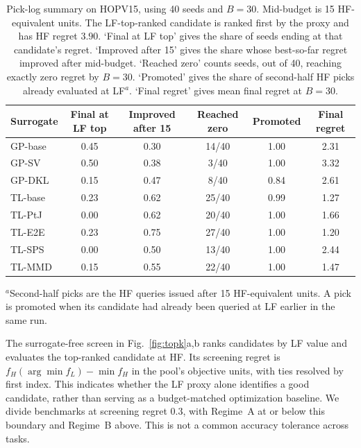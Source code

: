 \begin{table}[p]
\centering
\scriptsize
\caption{Pick-log summary on HOPV15, using 40 seeds and $B = 30$. Mid-budget is 15 HF-equivalent units. The LF-top-ranked candidate is ranked first by the proxy and has HF regret $3.90$. `Final at LF top' gives the share of seeds ending at that candidate's regret. `Improved after 15' gives the share whose best-so-far regret improved after mid-budget. `Reached zero' counts seeds, out of 40, reaching exactly zero regret by $B = 30$. `Promoted' gives the share of second-half HF picks already evaluated at LF$^{a}$. `Final regret' gives mean final regret at $B = 30$.}
\label{supptab:hopv15_picklog}
\begin{tabular}{@{}lccccc@{}}
\toprule
Surrogate & Final at LF top & Improved after 15 & Reached zero & Promoted & Final regret \\
\midrule
GP-base & 0.45 & 0.30 & 14/40 & 1.00 & 2.31 \\
GP-SV & 0.50 & 0.38 & 3/40 & 1.00 & 3.32 \\
GP-DKL & 0.15 & 0.47 & 8/40 & 0.84 & 2.61 \\
TL-base & 0.23 & 0.62 & 25/40 & 0.99 & 1.27 \\
TL-PtJ & 0.00 & 0.62 & 20/40 & 1.00 & 1.66 \\
TL-E2E & 0.23 & 0.75 & 27/40 & 1.00 & 1.20 \\
TL-SPS & 0.00 & 0.50 & 13/40 & 1.00 & 2.44 \\
TL-MMD & 0.15 & 0.55 & 22/40 & 1.00 & 1.47 \\
\bottomrule
\end{tabular}
\par\smallskip
{\scriptsize $^{a}$Second-half picks are the HF queries issued after 15 HF-equivalent units. A pick is promoted when its candidate had already been queried at LF earlier in the same run.}
\end{table}


The surrogate-free screen in Fig.~\ref{fig:topk}a,b ranks candidates by LF value and evaluates the top-ranked candidate at HF. Its screening regret is $f_H(\arg\min f_L) - \min f_H$ in the pool's objective units, with ties resolved by first index. This indicates whether the LF proxy alone identifies a good candidate, rather than serving as a budget-matched optimization baseline. We divide benchmarks at screening regret $0.3$, with Regime~A at or below this boundary and Regime~B above. This is not a common accuracy tolerance across tasks.

